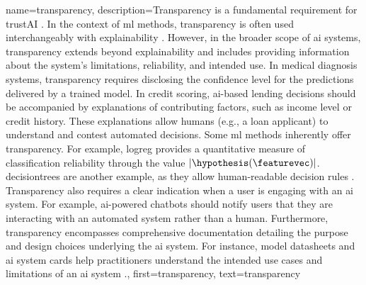 {{%

{name={transparency},
	description={Transparency is a fundamental requirement for 
		\gls{trustAI} \cite{HLEGTrustworhtyAI}. In the context of \gls{ml} 
		methods, transparency is often used interchangeably with \gls{explainability} 
		\cite{gallese2023ai,JunXML2020}. However, in the broader scope of \gls{ai} 
		systems, transparency extends beyond \gls{explainability} and includes providing information 
		about the system’s limitations, reliability, and intended use. 
		In medical diagnosis systems, transparency requires disclosing the confidence level 
		for the \gls{prediction}s delivered by a trained \gls{model}. In credit scoring, 
		\gls{ai}-based lending decisions should be accompanied by explanations of 
		contributing factors, such as income level or credit history. These explanations 
		allow humans (e.g., a loan applicant) to understand and contest automated decisions. 
		Some \gls{ml} methods inherently offer transparency. For example, \gls{logreg} 
		provides a quantitative measure of \gls{classification} reliability through the value $|\hypothesis(\featurevec)|$. 
		\Gls{decisiontree}s are another example, as they allow human-readable decision rules \cite{rudin2019stop}.
		Transparency also requires a clear indication when a user is engaging with an \gls{ai} system. 
		For example, \gls{ai}-powered chatbots should notify users that they are interacting with an 
		automated system rather than a human. Furthermore, transparency encompasses comprehensive 
		documentation detailing the purpose and design choices underlying the \gls{ai} system. 
		For instance, \gls{model} datasheets \cite{DatasheetData2021} and \gls{ai} system cards \cite{10.1145/3287560.3287596} 
		help practitioners understand the intended use cases and limitations of an \gls{ai} system \cite{Shahriari2017}.},
	first={transparency}, text={transparency} 
}



}}
